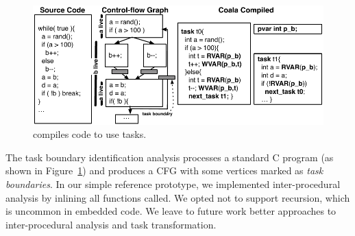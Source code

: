 %
%


\begin{figure}
	\centering
	\includegraphics[width=\columnwidth]{figures/compiler.pdf}
	\caption{\sys compiles code to use tasks.}
	\label{fig:compiler_overview}
\end{figure}

The task boundary identification analysis processes a standard C program (as
shown in Figure~\ref{fig:compiler_overview}) and produces a CFG with some vertices marked as {\em task boundaries}. In our simple reference prototype, we implemented inter-procedural analysis by inlining all functions called. We opted not to support recursion, which is uncommon in embedded code. We leave to future work better approaches to inter-procedural analysis and task transformation.

